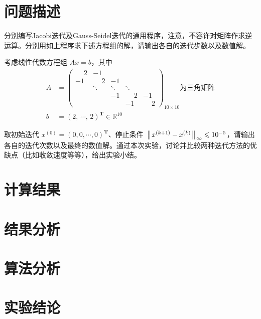 \documentclass[11pt]{article}
\begin{document}
\maketitle %

\thispagestyle{empty} %

\newpage

\section{问题描述}
分别编写Jacobi迭代及Gauss-Seidel迭代的通用程序，注意，不容许对矩阵作求逆运算。分别用如上程序求下述方程组的解，请输出各自的迭代步数以及数值解。

考虑线性代数方程组 $Ax = b$，其中
\begin{align*}
    A & =
    \begin{pmatrix}
        \phantom{-}2 & -1           &        &              &              \\
        -1           & \phantom{-}2 & -1     &              &              \\
                     & \ddots       & \ddots & \ddots       &              \\
                     &              & -1     & \phantom{-}2 & -1           \\
                     &              &        & -1           & \phantom{-}2
    \end{pmatrix}_{10 \times 10}
    \text{为三角矩阵}                                       \\
    b & = (2,\, \cdots,\, 2)^\mathbf{T} \in \mathbb{R}^{10}
\end{align*}

取初始迭代 $x^{(0)} = (0, 0, \cdots, 0)^\mathbf{T}$、停止条件 $\left\Arrowvert x^{(k + 1)} - x^{(k)} \right\Arrowvert_{\infty} \leqslant 10^{-5}$，请输出各自的迭代次数以及最终的数值解。通过本次实验，讨论并比较两种迭代方法的优缺点（比如收敛速度等等），给出实验小结。


\section{计算结果}

\section{结果分析}

\section{算法分析}

\section{实验结论}
\end{document}
